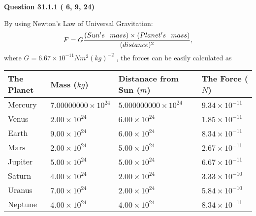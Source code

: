 \documentclass[12pt]{article}
\begin{document}
\vspace{0.2in}
  
{\textbf{\Large{Question
31.1.1 
 (          6,          9,         24)
}}}
  
  
 
 
\noindent{}

By using Newton's Law of Universal Gravitation:
\[
F=G \frac{(Sun's \hspace{0.1in} mass) \times (Planet's \hspace{0.1in} mass)} { (distance)^2},
\]
where
$ G= %
6.67 \times 10^{-11}N m^{2}(kg)^{-2}$ , the forces can be easily calculated as
 
\vspace{0.2in}
 
 
\begin{tabular}{|l|l|l|l|}
\hline
The Planet & Mass ($kg$) & Distanace from Sun ($m$) & The Force ($N$)\\
\hline
Mercury  &
           $ %
7.00000000 \times 10^{24} $   &
             $ %
5.000000000 \times 10^{24} $    & $ %
9.34 \times 10^{-11} $
\\  \hline
Venus    &
           $  %
2.00 \times 10^{24}  $     &
             $ %
6.00 \times 10^{24} $    & $ %
1.85 \times 10^{-11} $
\\  \hline
Earth    &
           $  %
9.00 \times 10^{24}  $     &
             $ %
6.00 \times 10^{24} $    & $ %
8.34 \times 10^{-11} $
\\   \hline
Mars     &
           $  %
2.00 \times 10^{24} $     &
             $ %
5.00 \times 10^{24} $    & $ %
2.67 \times 10^{-11} $
\\   \hline
Jupiter  &
           $  %
5.00 \times 10^{24} $    &
             $ %
5.00 \times 10^{24} $    & $ %
6.67 \times 10^{-11} $
\\  \hline
Saturn   &
           $  %
4.00 \times 10^{24} $    &
             $ %
2.00 \times 10^{24}  $    & $ %
3.33 \times 10^{-10} $
\\  \hline
Uranus   &
           $  %
7.00 \times 10^{24} $    &
             $ %
2.00 \times 10^{24} $    & $ %
5.84 \times 10^{-10} $
\\  \hline
Neptune  &
           $  %
4.00 \times 10^{24} $    &
             $ %
4.00 \times 10^{24} $    & $ %
8.34 \times 10^{-11} $
\\  \hline
 
\end{tabular}
 
\end{document}
